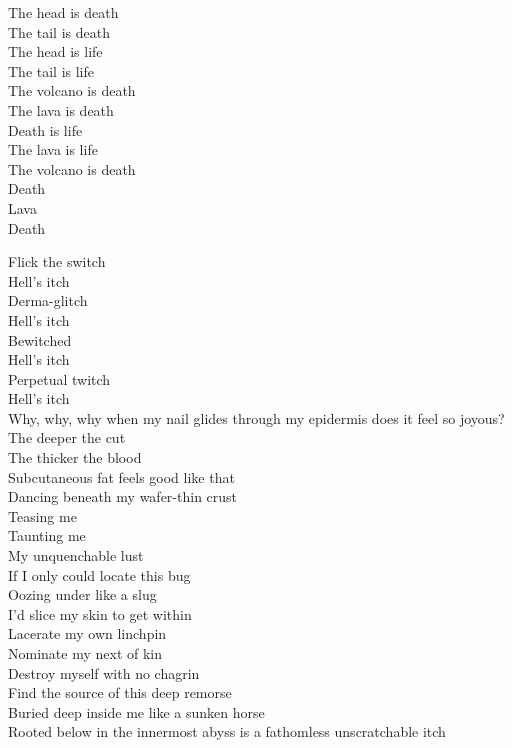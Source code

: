 The head is death \\
The tail is death \\
The head is life \\
The tail is life \\

The volcano is death \\
The lava is death \\
Death is life \\
The lava is life \\

The volcano is death \\
Death \\
Lava \\
Death \\




Flick the switch \\
Hell's itch \\
Derma-glitch \\
Hell's itch \\
Bewitched \\
Hell's itch \\
Perpetual twitch \\
Hell's itch \\

Why, why, why when my nail glides through my epidermis does it feel so joyous? \\
The deeper the cut \\
The thicker the blood \\
Subcutaneous fat feels good like that \\
Dancing beneath my wafer-thin crust \\
Teasing me \\
Taunting me \\
My unquenchable lust \\
If I only could locate this bug \\
Oozing under like a slug \\
I'd slice my skin to get within \\
Lacerate my own linchpin \\
Nominate my next of kin \\
Destroy myself with no chagrin \\
Find the source of this deep remorse \\
Buried deep inside me like a sunken horse \\
Rooted below in the innermost abyss is a fathomless unscratchable itch \\


